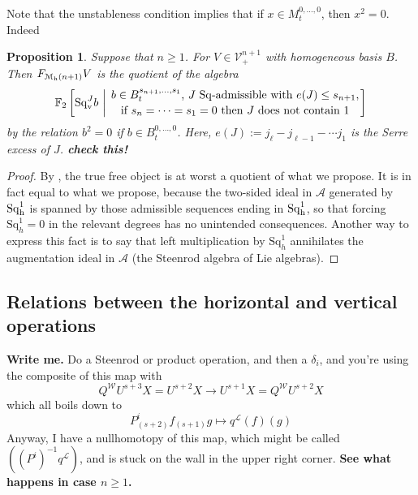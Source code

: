 \documentclass[11pt]{amsart}
\theoremstyle{plain}
\newtheorem{prop}[thm]{Proposition}
\theoremstyle{definition}
\renewcommand{\to}{\longrightarrow}
\newcommand{\calW}{\mathcal{W}}
\newcommand{\calA}{\mathcal{A}}
\newcommand{\calL}{\mathcal{L}}
\newcommand{\calV}{\mathcal{V}}
\newcommand{\calM}{\mathcal{M}}
\theoremstyle{plain}
\newcommand{\vect}[2]{\calV^{#1}_{#2}}
\newcommand{\excess}{e}
\newcommand{\Sq}{\mathrm{Sq}}
\newcommand{\LieSteen}{\calA}
\newcommand{\F}{\mathbb{F}}
\begin{document}
\begin{Cohomology operations for all unstable Lie algebras}
Note that the unstableness condition implies that if $x\in M_t^{0,\ldots,0}$, then $x^2=0$. Indeed
\begin{prop}\label{basis of free horizontal operations algebra}
Suppose that $n\geq1$. For $V\in\vect{n+1}{+}$ with homogeneous basis $B$. Then $F_{\calM_\textup{h}(n+1)}V$ is the quotient of the algebra
\[\F_2\left[\Sq^J_{\textup{v}}b\ \middle|\ \genfrac{}{}{0pt}{}{b\in B^{s_{n+1},\ldots,s_1}_t\textup{, $J$ $\Sq$-admissible with }\excess(J)\leq s_{n+1},}{\textup{if }s_{n}=\cdots=s_1=0\textup{ then $J$ does not contain 1}}\right]\]
by the relation $b^2=0$ if $b\in B_t^{0,\ldots,0}$. Here, $e(J):=j_\ell-j_{\ell-1}-\cdots j_1$ is the Serre excess of $J$. \textbf{{check this!}}
\end{prop}
\begin{proof}
By \cite[6.1]{PriddySimplicialLie.pdf}, the true free object is at worst a quotient of what we propose. It is in fact equal to what we propose, because the two-sided ideal in $\LieSteen$ generated by $\Sq^1_\textup{h}$ is spanned by those admissible sequences ending in $\Sq^1_\textup{h}$, so that forcing $\Sq^1_h=0$ in the relevant degrees has no unintended consequences. Another way to express this fact is to say that left multiplication by $\Sq^1_h$ annihilates the augmentation ideal in $\LieSteen$ (the Steenrod algebra of Lie algebras).
\end{proof}

\subsection{Relations between the horizontal and vertical operations}
\textbf{Write me.} Do a Steenrod or product operation, and then a $\delta_i$, and you're using the composite of this map with
\[Q^\calW U^{s+3}X=U^{s+2}X\to U^{s+1}X=Q^\calW U^{s+2}X\]
which all boils down to
\[P^i_{(s+2)}f_{(s+1)}g\mapsto q^{\calL}(f)(g)\]
Anyway, I have a nullhomotopy of this map, which might be called $((P^i)^{-1}q^{\calL})$, and is stuck on the wall in the upper right corner. \textbf{See what happens in case $n\geq1$.}


\end{Cohomology operations for all unstable Lie algebras}
\end{document}
